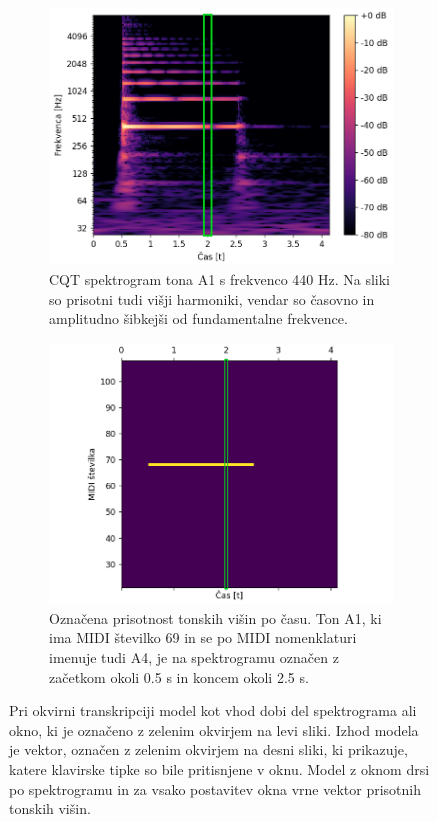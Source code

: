 \documentclass[a4paper, 12pt, openright]{book}
\begin{document}
\begin{figure}
    \centering
    \begin{subfigure}[t]{.45\textwidth}
        \centering
        \includegraphics[width=\linewidth]{input.png}
        \caption{CQT spektrogram tona A1 s frekvenco 440 Hz. Na sliki so prisotni tudi višji harmoniki, vendar so časovno in amplitudno šibkejši od fundamentalne frekvence.}
        \label{fig:spec}
    \end{subfigure}%
    \hspace{1em}%
    \begin{subfigure}[t]{.45\textwidth}
        \centering
        \includegraphics[width=\linewidth]{input_out.png}
        \caption{Označena prisotnost tonskih višin po času. Ton A1, ki ima MIDI številko 69 in se po MIDI nomenklaturi imenuje tudi A4, je na spektrogramu označen z začetkom okoli 0.5 s in koncem okoli 2.5 s.}
        \label{fig:spec_out}
    \end{subfigure}
    \caption{Pri okvirni transkripciji model kot vhod dobi del spektrograma ali okno, ki je označeno z zelenim okvirjem na levi sliki. Izhod modela je vektor, označen z zelenim okvirjem na desni sliki, ki prikazuje, katere klavirske tipke so bile pritisnjene v oknu. Model z oknom drsi po spektrogramu in za vsako postavitev okna vrne vektor prisotnih tonskih višin.}
    \label{fig:window}
\end{figure}
\end{document}
